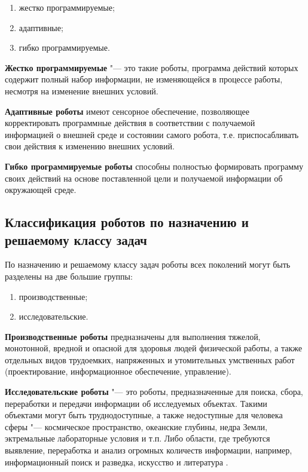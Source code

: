 \documentclass[bachelor, och, referat]{SCWorks}
\begin{document}
\begin{enumerate}
    \item жестко программируемые;
    \item адаптивные;
    \item гибко программируемые.
\end{enumerate}

\textbf{Жестко программируемые} "--- это такие роботы, программа действий
которых содержит полный набор информации, не изменяющейся в процессе работы,
несмотря на изменение внешних условий.

\textbf{Адаптивные роботы} имеют сенсорное обеспечение, позволяющее
корректировать программные действия в соответствии с получаемой информацией о
внешней среде и состоянии самого робота, т.е. приспосабливать свои действия к
изменению внешних условий.

\textbf{Гибко программируемые роботы} способны полностью формировать программу
своих действий на основе поставленной цели и получаемой информации об окружающей
среде.

\subsection{Классификация роботов по назначению и решаемому классу задач}

По назначению и решаемому классу задач роботы всех поколений могут быть
разделены на две большие группы:

\begin{enumerate}
    \item производственные;
    \item исследовательские.
\end{enumerate}

\textbf{Производственные роботы} предназначены для выполнения тяжелой,
монотонной, вредной и опасной для здоровья людей физической работы, а также
отдельных видов трудоемких, напряженных и утомительных умственных работ
(проектирование, информационное обеспечение, управление).

\textbf{Исследовательские роботы} "--- это роботы, предназначенные для поиска,
сбора, переработки и передачи информации об исследуемых объектах. Такими
объектами могут быть труднодоступные, а также недоступные для человека сферы
"--- космическое пространство, океанские глубины, недра Земли, эктремальные
лабораторные условия и т.п. Либо области, где требуются выявление, переработка и
анализ огромных количеств информации, например, информационный поиск и разведка,
искусство и литература \cite{11}.
\end{document}
